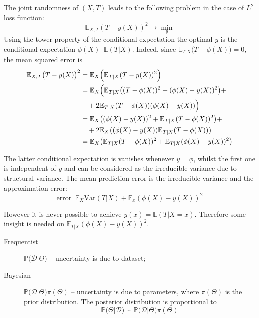 \documentclass[a4paper]{article}
\newcommand{\Dcal}{\mathcal{D}}
\newcommand{\ex}{\mathbb{E}}
\newcommand{\pr}[0]{{\mathbb{P}}}
\newcommand{\Var}[0]{{\text{Var}}}
\newcommand{\defn}{\mathop{\overset{\Delta}{=}}\nolimits}
\begin{document}
The joint randomness of $(X,T)$ leads to the following problem in the case of
$L^2$ loss function:
\[\ex_{X,T} (T-y(X))^2 \to \min_y\]
Using the tower property of the conditional expectation the optimal $y$ is the
conditional expectation $\phi(X)\defn \ex(T\rvert X)$. Indeed, since
$\ex_{T\rvert X} \bigl(T-\phi(X) \bigr) = 0$, the mean squared error is
\begin{align*}
	\ex_{X,T} \bigl(T-y(X)\bigr)^2 &= \ex_{X} \Bigl( \ex_{T\rvert X} (T-y(X))^2 \Bigr) \\
		&= \ex_X \Bigl( \ex_{T\rvert X} \bigl( (T-\phi(X))^2+(\phi(X)-y(X))^2 \bigr) + \\
			&\quad + 2 \ex_{T\rvert X} (T-\phi(X))(\phi(X)-y(X)) \Bigr) \\
		&= \ex_X \bigl( (\phi(X)-y(X))^2 + \ex_{T\rvert X} (T-\phi(X))^2 \bigr) + \\
			&\quad + 2 \ex_X \bigl((\phi(X)-y(X)) \ex_{T\rvert X} (T-\phi(X)) \bigr) \\
		&= \ex_X \bigl( \ex_{T\rvert X} (T-\phi(X))^2 + \ex_{T\rvert X} (\phi(X)-y(X))^2 \bigr)
\end{align*}

The latter conditional expectation is vanishes whenever $y=\phi$, whilst the first
one is independent of $y$ and can be considered as the irreducible variance due
to structural variance. The mean prediction error is the irreducible variance and
the approximation error:
\[\text{error} \defn \ex_X \Var(T\rvert X) + \ex_x (\phi(X)-y(X))^2 \]

However it is never possible to achieve $y(x) = \ex(T\rvert X=x)$.
Therefore some insight is needed on $\ex_{T\rvert X} (\phi(X)-y(X))^2$.
\begin{description}
	\item[Frequentist] $\pr\bigl(\Dcal\rvert \Theta\bigr)$ -- uncertainty is due
	to dataset;
	\item[Bayesian] $\pr\bigl(\Dcal\rvert \Theta\bigr) \pi(\Theta)$ -- uncertainty
	is due to parameters, where $\pi(\Theta)$ is the prior distribution. The posterior
	distribution is proportional to
		\[\pr\bigl(\Theta\rvert \Dcal\bigr) \sim \pr\bigl(\Dcal\rvert \Theta\bigr) \pi(\Theta)\]
\end{description}
\end{document}
